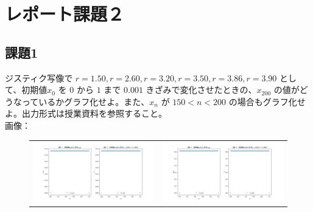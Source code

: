 \section{レポート課題２}
\subsection{課題1}
ジスティク写像で $r = 1.50, r = 2.60, r = 3.20, r = 3.50, r = 3.86, r = 3.90$ として、初期値$x_0$ を $0$ から $1$ まで $0.001$ きざみで変化させたときの、$x_{200}$ の値がどうなっているかグラフ化せよ。また、$x_n$ が $150 < n < 200$ の場合もグラフ化せよ。出力形式は授業資料を参照すること。\\
画像：\\
\begin{figure}[htbp]
  \begin{tabular}{cc}
    \begin{minipage}[t]{0.45\hsize}
      \centering
      \includegraphics[keepaspectratio, scale=0.25]{images/Problem2/ctest3_1.png}
    \end{minipage} &
    \begin{minipage}[t]{0.45\hsize}
      \centering
      \includegraphics[keepaspectratio, scale=0.25]{images/Problem2/ctest3_2.png}
    \end{minipage} \\


\end{tabular}
\end{figure}
